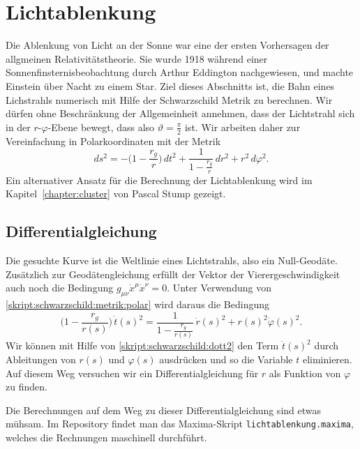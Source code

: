 %
%
%
\section{Lichtablenkung}
%
Die Ablenkung von Licht an der Sonne war eine der ersten Vorhersagen der
allgmeinen Relativitätstheorie.
Sie wurde 1918 während einer Sonnenfinsternisbeobachtung durch
Arthur Eddington nachgewiesen, und machte Einstein über Nacht zu einem Star.
%
Ziel dieses Abschnitts ist, die Bahn eines Lichstrahls numerisch
mit Hilfe der Schwarzschild Metrik zu berechnen.
Wir dürfen ohne Beschränkung der Allgemeinheit annehmen, dass der Lichtstrahl
sich in der $r$-$\varphi$-Ebene bewegt, dass also $\vartheta=\frac\pi2$ ist.
Wir arbeiten daher zur Vereinfachung in Polarkoordinaten mit der Metrik
\begin{equation}
ds^2
=
-\biggl(1-\frac{r_g}{r}\biggr)\,dt^2
+ \frac{1}{\displaystyle 1-\frac{r_g}{r}}\,dr^2
+ r^2\,d\varphi^2.
\label{skript:schwarzschild:metrik:polar}
\end{equation}
Ein alternativer Ansatz für die Berechnung der Lichtablenkung wird im
Kapitel~\ref{chapter:cluster} von Pascal Stump gezeigt.

\subsection{Differentialgleichung%
\label{skript:lichtablenkung:dgl}}
Die gesuchte Kurve ist die Weltlinie eines Lichtstrahls, also ein Null-Geodäte. 
Zusätzlich zur Geodätengleichung erfüllt der Vektor der Vierergeschwindigkeit
auch noch die Bedingung $g_{\mu\nu}\dot x^\mu \dot x^\nu=0$.
Unter Verwendung von \eqref{skript:schwarzschild:metrik:polar}
wird daraus die Bedingung
\begin{equation}
\biggl(1-\frac{r_g}{r(s)}\biggr)\,\dot t(s)^2
=
\frac{1}{\displaystyle 1-\frac{r_g}{r(s)}}\,\dot r(s)^2
+ r(s)^2\dot \varphi(s)^2.
\label{skript:schwarzschild:dott2}
\end{equation}
Wir können mit Hilfe von \eqref{skript:schwarzschild:dott2}
den Term $\dot t(s)^2$ durch Ableitungen von $r(s)$ und $\varphi(s)$
ausdrücken und so die Variable $t$ eliminieren.
Auf diesem Weg versuchen wir ein Differentialgleichung für $r$
als Funktion von $\varphi$ zu finden.

Die Berechnungen auf dem Weg zu dieser Differentialgleichung sind
etwas mühsam.
Im Repository findet man das Maxima-Skript \texttt{lichtablenkung.maxima},
welches die Rechnungen maschinell durchführt.

